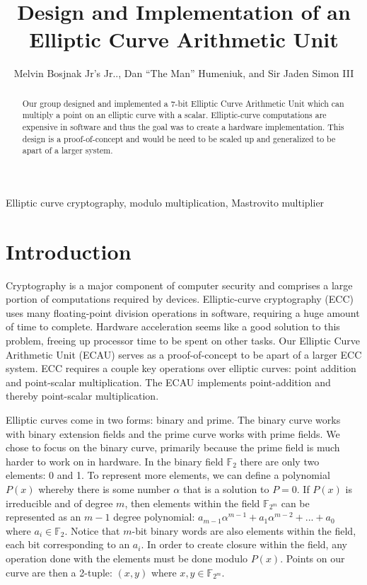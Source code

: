 \documentclass{IEEEtran}
\begin{document}
\title{Design and Implementation of an Elliptic Curve Arithmetic Unit}

\author{Melvin Bosjnak Jr's Jr.., Dan ``The Man'' Humeniuk, and Sir Jaden Simon III}

\maketitle

\begin{abstract}

Our group designed and implemented a 7-bit Elliptic Curve Arithmetic Unit which can multiply a point on an elliptic curve with a scalar. Elliptic-curve computations are expensive in software and thus the goal was to create a hardware implementation. This design is a proof-of-concept and would be need to be scaled up and generalized to be apart of a larger system. 

\end{abstract}

\begin{IEEEkeywords}
Elliptic curve cryptography, modulo multiplication, Mastrovito multiplier

\end{IEEEkeywords}

\section{Introduction}

Cryptography is a major component of computer security and comprises a large portion of computations required by devices. Elliptic-curve cryptography (ECC) uses many floating-point division operations in software, requiring a huge amount of time to complete. Hardware acceleration seems like a good solution to this problem, freeing up processor time to be spent on other tasks. Our Elliptic Curve Arithmetic Unit (ECAU) serves as a proof-of-concept to be apart of a larger ECC system. ECC requires a couple key operations over elliptic curves: point addition and point-scalar multiplication. The ECAU implements point-addition and thereby point-scalar multiplication.

Elliptic curves come in two forms: binary and prime. The binary curve works with binary extension fields and the prime curve works with prime fields. We chose to focus on the binary curve, primarily because the prime field is much harder to work on in hardware. In the binary field $\mathbb{F}_2$ there are only two elements: 0 and 1. To represent more elements, we can define a polynomial $P(x)$ whereby there is some number $\alpha$ that is a solution to $P=0$. If $P(x)$ is irreducible and of degree $m$, then elements within the field $\mathbb{F}_{2^m}$ can be represented as an $m-1$ degree polynomial: $a_{m-1}\alpha^{m-1} + a_1\alpha^{m-2} + ... + a_{0}$ where $a_{i} \in \mathbb{F}_2$. Notice that $m$-bit binary words are also elements within the field, each bit corresponding to an $a_{i}$. In order to create closure within the field, any operation done with the elements must be done modulo $P(x)$. Points on our curve are then a 2-tuple: $(x, y)$ where $x, y \in \mathbb{F}_{2^m}$.
\end{document}
